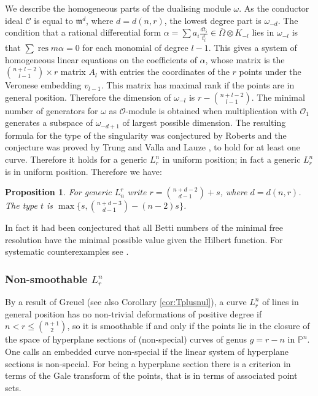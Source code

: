 \documentclass{amsart}
\renewcommand{\P}{\mathbb{P}}
\newcommand {\m}{\mathfrak{m}}
\DeclareMathOperator{\res}{res}
\renewcommand{\ell}{l}
\newcommand{\mO}{\mathcal{O}}
\newtheorem{prop}[thm]{Proposition}
\theoremstyle{definition}
\theoremstyle{remark}
\begin{document}
We describe the homogeneous parts of the dualising module $\omega$.
 As the conductor ideal $\mathcal C $ is equal to $\m^d$, where $d=d(n,r)$,
 the lowest degree part is $\omega_{-d}$.
The condition that  a rational differential form $\alpha =\sum a_i \frac{dt_i}{t_i^\ell} 
 \in \overline \Omega\otimes K_{-\ell}$ lies in $\omega_{-\ell}$ is that $\sum \res m \alpha=0$
 for each monomial of degree $\ell -1$. This gives a system of homogeneous linear equations on the
 coefficients of $\alpha$, whose matrix is the $\binom{n+\ell-2}{\ell-1}\times r$ matrix $A_\ell$
 with entries
the coordinates of the $r$ points under the Veronese embedding $v_{\ell-1}$.
 This matrix has maximal rank if the points are in general position.
 Therefore the dimension of $\omega_{-\ell}$ is $r-\binom{n+\ell-2}{\ell-1}$.
 The minimal number of generators for $\omega$ as $\mO$-module
is obtained  when multiplication with $\mO_1$ generates a subspace of $\omega_{-d+1}$
of largest possible dimension. The resulting formula for the type of the singularity
was conjectured by Roberts \cite{Ro} and the conjecture was proved by Trung and Valla \cite{TV} and Lauze \cite{La}, to hold for at least  one curve. Therefore it holds for 
a  generic $L_r^n$ in uniform position; in fact a generic  $L_r^n$ is  in uniform position.
Therefore we have:
 
 \begin{prop}\label{prop:type}
 For generic $L_n^r$ 
 write $r=\binom{n+d-2}{d-1} +s$, where  $d=d(n,r)$.
The type $t$ is $\max \{ s, \binom{n+d-3}{d-1}-(n-2)s\}$.
 \end{prop}
 
 

In fact it had been conjectured that all Betti numbers of the minimal free resolution
have the minimal possible value given the Hilbert function. For systematic counterexamples
see \cite{EP2}.

\subsubsection{Non-smoothable $L_r^n$}
By a result of Greuel \cite[3.5]{Gr} (see also Corollary \ref{cor:Tplusnul}), 
a curve $L_r^n$ of lines in general position  has no non-trivial
deformations of positive degree if $n<r\leq \binom{n+1}2$,
so it is smoothable if and only if the points lie in the closure of the space of
hyperplane sections of (non-special) curves of genus $g=r-n$ in $\P^n$. One
calls an embedded curve non-special if the linear system of hyperplane sections is 
non-special. For being a hyperplane section  there is a 
criterion in terms of the Gale transform of the points, that is in terms of associated point sets.
\end{document}

